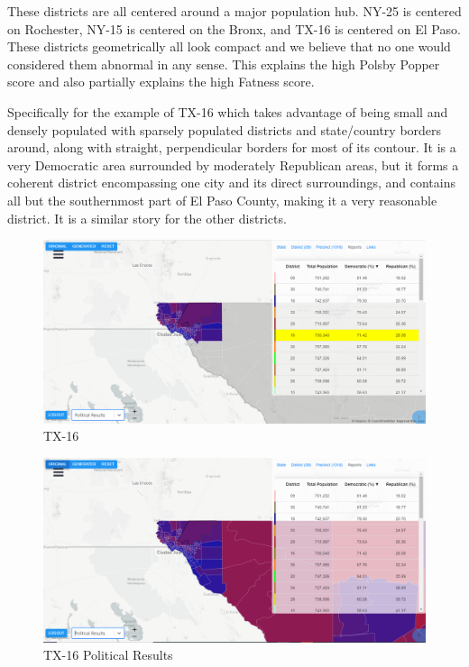 \documentclass[letterpaper]{article}
\begin{document}
These districts are all centered around a major population hub. NY-25 is centered on Rochester, NY-15 is centered on the Bronx, and TX-16 is centered on El Paso. These districts geometrically all look compact and we believe that no one would considered them abnormal in any sense. This explains the high Polsby Popper score and also partially explains the high Fatness score. 

Specifically for the example of TX-16 which takes advantage of being small and densely populated with sparsely populated districts and state/country borders around, along with straight, perpendicular borders for most of its contour. It is a very Democratic area surrounded by moderately Republican areas, but it forms a coherent district encompassing one city and its direct surroundings, and contains all but the southernmost part of El Paso County, making it a very reasonable district. It is a similar story for the other districts.

\begin{figure}[H]
	\includegraphics[width=\linewidth]{./figures/TX-16.png}
	\caption{TX-16}
	\label{fig:tx16border}
\end{figure}

\begin{figure}[H]
	\includegraphics[width=\linewidth]{./figures/TX-16-SurroundingArea.png}
	\caption{TX-16 Political Results}
	\label{fig:tx16political}
\end{figure}
\end{document}
